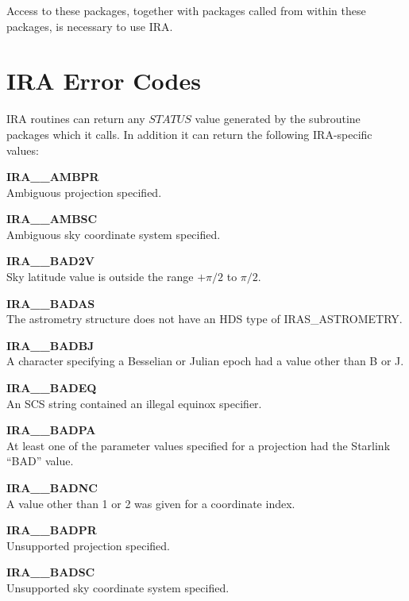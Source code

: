 Access to these packages, together with packages called from within these 
packages, is necessary to use IRA. 

\section {IRA Error Codes}
\label {APP:ERRORS}
IRA routines can return any $STATUS$ value generated by the subroutine packages 
which it calls. In addition it can return the following IRA-specific values:

\begin{description}

\item {\bf IRA\_\_AMBPR   }\\
Ambiguous projection specified.

\item {\bf IRA\_\_AMBSC   }\\  
Ambiguous sky coordinate system specified.

\item {\bf IRA\_\_BAD2V   }\\  
Sky latitude value is outside the range $+\pi/2$ to $\pi/2$.

\item {\bf IRA\_\_BADAS   }\\  
The astrometry structure does not have an HDS type of IRAS\_ASTROMETRY.

\item {\bf IRA\_\_BADBJ   }\\  
A character specifying a Besselian or Julian epoch had a value other than B or J.

\item {\bf IRA\_\_BADEQ   }\\  
An SCS string contained an illegal equinox specifier.

\item {\bf IRA\_\_BADPA   }\\  
At least one of the parameter values specified for a projection had the 
Starlink ``BAD'' value.

\item {\bf IRA\_\_BADNC   }\\  
A value other than 1 or 2 was given for a coordinate index.

\item {\bf IRA\_\_BADPR   }\\  
Unsupported projection specified.

\item {\bf IRA\_\_BADSC   }\\  
Unsupported sky coordinate system specified.


\end{description}
